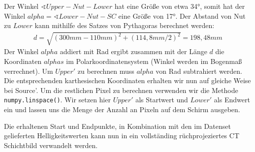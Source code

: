\documentclass[]{dsadokumentation}
\begin{document}
Der Winkel $\sphericalangle Upper-Nut-Lower$ hat eine Größe von etwa 34°, somit hat der Winkel $alpha = \sphericalangle Lower-Nut-SC$ eine Größe von 17°. Der Abstand von Nut zu $Lower$ kann mithilfe des Satzes von Pythagoras berechnet werden:
\begin{align}
d = \sqrt{(300mm - 110mm)^2+(114,8mm/2)^2} = 198,48mm
\end{align}
Der Winkel $alpha$ addiert mit Rad ergibt zusammen mit der Länge $d$ die Koordinaten $alphas$ im Polarkoordinatensystem (Winkel werden im Bogenmaß verrechnet). Um $Upper'$ zu berechnen muss $alpha$ von Rad subtrahiert werden. Die entsprechenden karthesischen Koordinaten erhalten wir nun auf gleiche Weise bei Source'. Um die restlichen Pixel zu berechnen verwenden wir die Methode \verb+numpy.linspace()+. Wir setzen hier $Upper'$ als Startwert und $Lower'$ als Endwert ein und lassen uns die Menge der Anzahl an Pixeln auf dem Schirm ausgeben. 

Die erhaltenen Start und Endpunkte, in Kombination mit den im Datenset gelieferten Helligkeitswerten kann nun in ein vollständing rüchprojeziertes CT Schichtbild verwandelt werden.

\printbibliography{}
\end{document}
